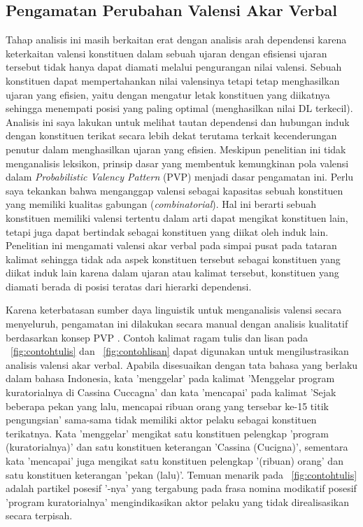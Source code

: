 \subsection{Pengamatan Perubahan Valensi Akar Verbal}
Tahap analisis ini masih berkaitan erat dengan analisis arah dependensi karena keterkaitan valensi konstituen dalam sebuah ujaran dengan efisiensi ujaran tersebut tidak hanya dapat diamati melalui pengurangan nilai valensi. Sebuah konstituen dapat mempertahankan nilai valensinya tetapi tetap menghasilkan ujaran yang efisien, yaitu dengan mengatur letak konstituen yang diikatnya sehingga menempati posisi yang paling optimal (menghasilkan nilai DL terkecil). Analisis ini saya lakukan untuk melihat tautan dependensi dan hubungan induk dengan konstituen terikat secara lebih dekat terutama terkait kecenderungan penutur dalam menghasilkan ujaran yang efisien. Meskipun penelitian ini tidak menganalisis leksikon, prinsip dasar yang membentuk kemungkinan pola valensi dalam \textit{Probabilistic Valency Pattern} (PVP) \citep{liu2006syntactic} menjadi dasar pengamatan ini. Perlu saya tekankan bahwa \cite{liu2006syntactic} menganggap valensi sebagai kapasitas sebuah konstituen yang memiliki kualitas gabungan (\textit{combinatorial}). Hal ini berarti sebuah konstituen memiliki valensi tertentu dalam arti dapat mengikat konstituen lain, tetapi juga dapat bertindak sebagai konstituen yang diikat oleh induk lain. Penelitian ini mengamati valensi akar verbal pada simpai pusat pada tataran kalimat sehingga tidak ada aspek konstituen tersebut sebagai konstituen yang diikat induk lain karena dalam ujaran atau kalimat tersebut, konstituen yang diamati berada di posisi teratas dari hierarki dependensi.

Karena keterbatasan sumber daya linguistik untuk menganalisis valensi secara menyeluruh, pengamatan ini dilakukan secara manual dengan analisis kualitatif berdasarkan konsep PVP \citep{liu2006syntactic}. Contoh kalimat ragam tulis dan lisan pada \pic~\ref{fig:contohtulis} dan \pic~\ref{fig:contohlisan} dapat digunakan untuk mengilustrasikan analisis valensi akar verbal. Apabila disesuaikan dengan tata bahasa yang berlaku dalam bahasa Indonesia, kata 'menggelar' pada kalimat 'Menggelar program kuratorialnya di Cassina Cuccagna' dan kata 'mencapai' pada kalimat 'Sejak beberapa pekan yang lalu, mencapai ribuan orang yang tersebar ke-15 titik pengungsian' sama-sama tidak memiliki aktor pelaku sebagai konstituen terikatnya. Kata 'menggelar' mengikat satu konstituen pelengkap 'program (kuratorialnya)' dan satu konstituen keterangan 'Cassina (Cucigna)', sementara kata 'mencapai' juga mengikat satu konstituen pelengkap '(ribuan) orang' dan satu konstituen keterangan 'pekan (lalu)'. Temuan menarik pada \pic~\ref{fig:contohtulis} adalah partikel posesif '-nya' yang tergabung pada frasa nomina modikatif posesif 'program kuratorialnya' mengindikasikan aktor pelaku yang tidak direalisasikan secara terpisah. 
